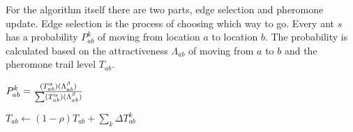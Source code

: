 For the algorithm itself there are two parts, edge selection and pheromone update. Edge selection is the process of choosing
which way to go. Every ant $s$ has a probability $P^k_{ab}$ of moving from location $a$ to location $b$. The probability
is calculated based on the attractiveness $\Lambda_{ab}$  of moving from $a$ to $b$ and the pheromone trail level $T_{ab}$.

\begin{math}
P^k_{ab} = {(T^\alpha_{ab})(\Lambda^\beta_{ab}) \over \sum (T^\alpha_{ab})(\Lambda^\beta_{ab})}
\end{math}



\begin{math}
T_{ab} \leftarrow (1 - \rho)T_{ab} + \sum_k \Delta T^k_{ab}
\end{math}















